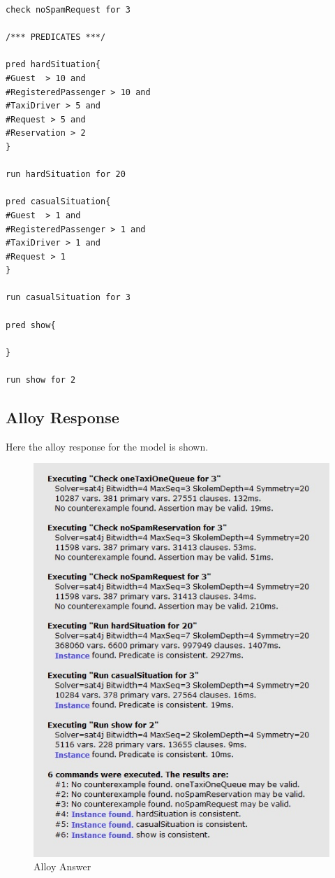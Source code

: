\begin{lstlisting}
check noSpamRequest for 3

/*** PREDICATES ***/

pred hardSituation{
#Guest  > 10 and
#RegisteredPassenger > 10 and
#TaxiDriver > 5 and
#Request > 5 and
#Reservation > 2
}

run hardSituation for 20

pred casualSituation{
#Guest  > 1 and
#RegisteredPassenger > 1 and
#TaxiDriver > 1 and
#Request > 1
}

run casualSituation for 3

pred show{

}

run show for 2

	\end{lstlisting}
	\newpage
	\subsection{Alloy Response}
	
	Here the alloy response for the model is shown.
	
	\begin{figure}[!h]
		\begin{center}			
			\includegraphics[scale=1]{../SE2_ALLOY/Answer}
			\caption{Alloy Answer}	
		\end{center}
	\end{figure}
	
